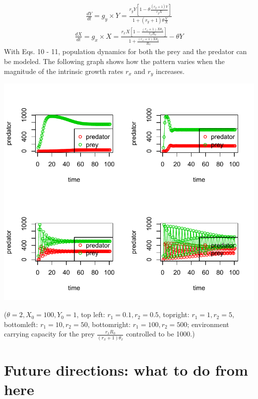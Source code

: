 \documentclass[12pt]{article}
\begin{document}
 \begin{equation}
 \begin{split}
\frac{d Y}{d t} =g_y \times Y = \frac{r_{y} Y [ 1 -  \theta  \frac{(r_{y} +1)Y}{r_y X} ]}{ 1+ (r_{y}+1) \theta \frac{Y}{X}} 
\end{split}
\end{equation}
 \begin{equation}
 \begin{split}
 \frac{d X}{d t}= g_x \times X =\frac{r_{x} X [1 -\frac{(r_{x} +1)X\theta_x}{r_x R_0 }]}{ 1 +  \frac{(r_{x} +1)X\theta_x}{R_0}}   -  \theta Y
\end{split}
\end{equation}
With Eqs. 10 - 11, population dynamics for both the prey and the predator can be modeled. The following graph shows how the pattern varies when the magnitude of the intrinsic growth rates $r_x$ and $r_y$ increases.

\includegraphics[width=\textwidth]{predator-prey-dynamics.pdf}

($\theta =2, X_0=100, Y_0 = 1$, top left: $r_1=0.1,r_2 = 0.5$, topright: $r_1=1,r_2 = 5$, bottomleft: $r_1=10,r_2 = 50$, bottomright: $r_1=100,r_2 = 500$; environment carrying capacity for the prey $\frac{r_x R_0}{(r_x+1)\theta_x}$ controlled to be 1000.)

\section{Future directions: what to do from here}
\end{document}
